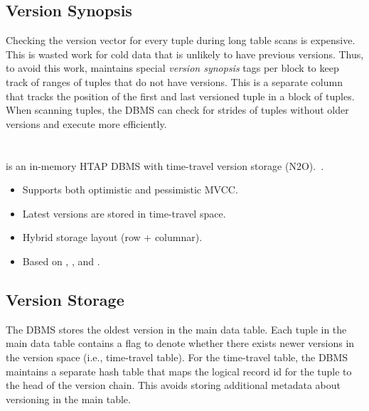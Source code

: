 \documentclass[11pt]{article}
\begin{document}
\subsection*{Version Synopsis}
Checking the version vector for every tuple during long table scans is expensive. This is wasted 
work for cold data that is unlikely to have previous versions. Thus, to avoid this work, 
 maintains special \textit{version synopsis} tags per block to keep track of ranges of 
tuples that do not have versions. This is a separate column that tracks the position of the first 
and last versioned tuple in a block of tuples.
When scanning tuples, the DBMS can check for strides of tuples without older versions and 
execute more efficiently.

\section{}
 is an in-memory HTAP DBMS with time-travel version storage (N2O).~\cite{farber2012sap}.
\begin{itemize}
    \item Supports both optimistic and pessimistic MVCC.
    \item Latest versions are stored in time-travel space.
    \item Hybrid storage layout (row + columnar).
    \item Based on , , and .
\end{itemize}

\subsection*{Version Storage}
The DBMS stores the oldest version in the main data table.
Each tuple in the main data table contains a flag to denote whether there exists newer versions in 
the version space (i.e., time-travel table). For the time-travel table, the DBMS maintains a 
separate hash table that maps the logical record id for the tuple to the head of the version chain. 
This avoids storing additional metadata about versioning in the main table.
\end{document}
